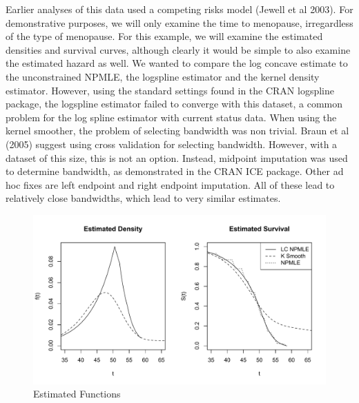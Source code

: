 \documentclass[12pt]{article}
\numberwithin{equation}{section}
\begin{document}
	Earlier analyses of this data used a competing risks model (Jewell et al 2003). For demonstrative purposes, we will only examine the time to menopause, irregardless of the type of menopause. For this example, we will examine the estimated densities and survival curves, although clearly it would be simple to also examine the estimated hazard as well. We wanted to compare the log concave estimate to the unconstrained NPMLE, the logspline estimator and the kernel density estimator. However, using the standard settings found in the CRAN logspline package, the logspline estimator failed to converge with this dataset, a common problem for the log spline estimator with current status data. When using the kernel smoother, the problem of selecting bandwidth was non trivial. Braun et al (2005) suggest using cross validation for selecting bandwidth. However, with a dataset of this size, this is not an option. Instead, midpoint imputation was used to determine bandwidth, as demonstrated in the CRAN ICE package. Other ad hoc fixes are left endpoint and right endpoint imputation. All of these lead to relatively close bandwidths, which lead to very similar estimates. 
		
\begin{figure}[h]
\centerline{\includegraphics[width = 12cm]{MenoPlot.pdf}}
\caption{Estimated Functions}
\end{figure}		
	
\end{document}
